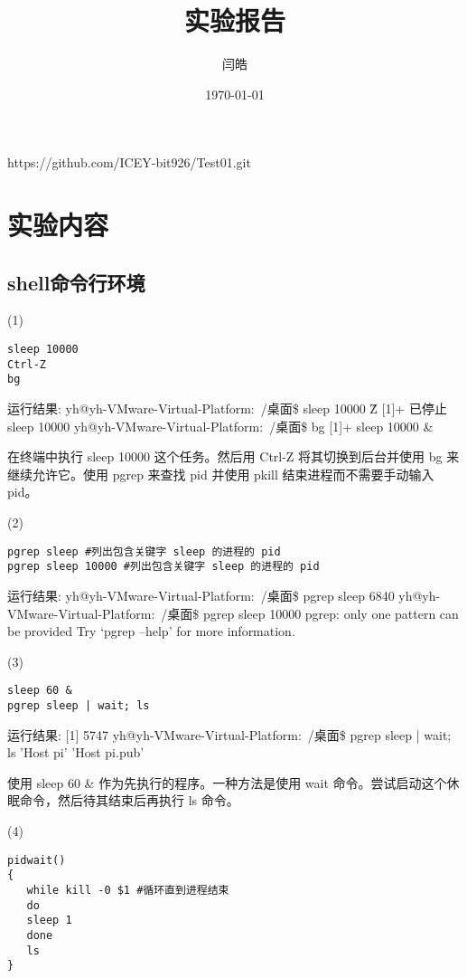 \documentclass[a4paper, 12pt]{article}
\begin{document}
  \title{实验报告}
  \author{闫皓}
  \date{\today}
  \maketitle
{\color{red}https://github.com/ICEY-bit926/Test01.git}

\tableofcontents
\newpage
{}

  \section{实验内容}
\subsection{shell命令行环境}
(1)\begin{verbatim}
sleep 10000
Ctrl-Z
bg
\end{verbatim}

运行结果:
{\color{blue}
yh@yh-VMware-Virtual-Platform:~/桌面\$ sleep 10000
\^Z
[1]+  已停止               sleep 10000
yh@yh-VMware-Virtual-Platform:~/桌面\$ bg
[1]+ sleep 10000 \&
}

在终端中执行 sleep 10000 这个任务。然后用 Ctrl-Z 将其切换到后台并使用 bg 来继续允许它。使用 pgrep 来查找 pid 并使用 pkill 结束进程而不需要手动输入 pid。

(2)\begin{verbatim}
pgrep sleep #列出包含关键字 sleep 的进程的 pid
pgrep sleep 10000 #列出包含关键字 sleep 的进程的 pid
\end{verbatim}

运行结果:
{\color{blue}
yh@yh-VMware-Virtual-Platform:~/桌面\$ pgrep sleep
6840
yh@yh-VMware-Virtual-Platform:~/桌面\$ pgrep sleep 10000
pgrep: only one pattern can be provided
Try `pgrep --help' for more information.
}  

(3)\begin{verbatim}
sleep 60 &
pgrep sleep | wait; ls
\end{verbatim}

运行结果:
{\color{blue}
[1] 5747
yh@yh-VMware-Virtual-Platform:~/桌面\$ pgrep sleep | wait; ls
'Host pi'  'Host pi.pub'
}

使用 sleep 60 \& 作为先执行的程序。一种方法是使用 wait 命令。尝试启动这个休眠命令，然后待其结束后再执行 ls 命令。

(4)\begin{verbatim}
pidwait()
{
   while kill -0 $1 #循环直到进程结束
   do
   sleep 1 
   done
   ls
}
\end{verbatim}
\end{document}
